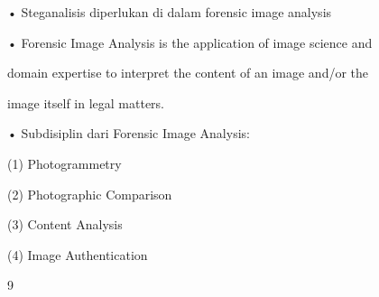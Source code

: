 \documentclass{article}
\begin{document}

• Steganalisis diperlukan di dalam forensic image analysis

• Forensic Image Analysis is the application of image science and 

domain expertise to interpret the content of an image and/or the 

image itself in legal matters.

• Subdisiplin dari Forensic Image Analysis: 

 (1) Photogrammetry

 (2) Photographic Comparison

 (3) Content Analysis

 (4) Image Authentication

9
\end{document}
